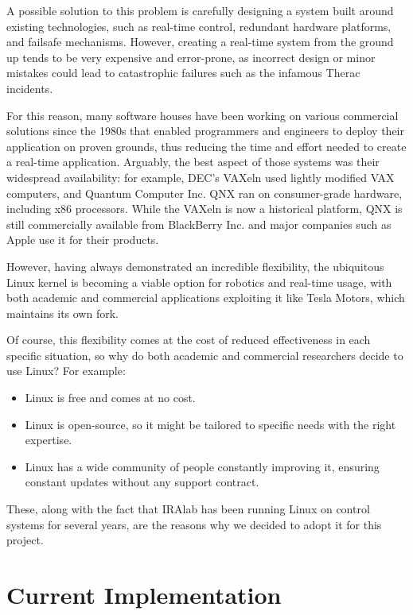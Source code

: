 \documentclass[a4paper,12pt]{report}
\begin{document}
A possible solution to this problem is carefully designing a system built around existing technologies, such as real-time control, redundant hardware platforms, and failsafe mechanisms. However, creating a real-time system from the ground up tends to be very expensive and error-prone, as incorrect design or minor mistakes could lead to catastrophic failures such as the infamous Therac\cite{therac-25-accidents} incidents.

For this reason, many software houses have been working on various commercial solutions since the 1980s that enabled programmers and engineers to deploy their application on proven grounds, thus reducing the time and effort needed to create a real-time application. Arguably, the best aspect of those systems was their widespread availability: for example, DEC's VAXeln used lightly modified VAX computers, and Quantum Computer Inc. QNX ran on consumer-grade hardware, including x86 processors. While the VAXeln is now a historical platform, QNX is still commercially available from BlackBerry Inc. and major companies such as Apple use it for their products\cite{time-carplay-qnx}.

However, having always demonstrated an incredible flexibility, the ubiquitous Linux kernel is becoming a viable option for robotics and real-time usage, with both academic and commercial applications exploiting it like Tesla Motors, which maintains its own fork\cite{gh-tesla-linux}.

Of course, this flexibility comes at the cost of reduced effectiveness in each specific situation, so why do both academic and commercial researchers decide to use Linux? For example:
\begin{itemize}
  \item Linux is free and comes at no cost.
  \item Linux is open-source, so it might be tailored to specific needs
        with the right expertise.
  \item Linux has a wide community of people constantly improving it,
        ensuring constant updates without any support contract.
\end{itemize}

These, along with the fact that IRAlab has been running Linux on control systems for several years, are the reasons why we decided to adopt it for this project.

\section{Current Implementation}
\end{document}
